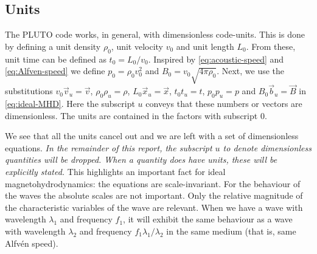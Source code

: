 \subsection{Units}
\label{sec:units}
The PLUTO code works, in general, with dimensionless code-units. This is done by defining a unit density $\rho_0$, unit velocity $v_0$ and unit length $L_0$.
From these, unit time can be defined as $t_0=L_0/v_0$. Inspired by \cref{eq:acoustic-speed} and \cref{eq:Alfven-speed} we define $p_0=\rho_0v_0^2$ and $B_0=v_0\sqrt{4\pi\rho_0}$.
Next, we use the substitutions $v_0\vec{v}_u=\vec{v}$, $\rho_0\rho_u=\rho$, $L_0\vec{x}_u=\vec{x}$, $t_0t_u=t$, $p_0p_u=p$ and $B_0\vec{b}_u=\vec{B}$ in \cref{eq:ideal-MHD}.
Here the subscript $u$ conveys that these numbers or vectors are dimensionless. The units are contained in the factors with subscript $0$.

{\centering 
\noindent {}
\par}

We see that all the units cancel out and we are left with a set of dimensionless equations.
\emph{In the remainder of this report, the subscript $u$ to denote dimensionless quantities will be dropped. When a quantity does have units, these will be explicitly stated.}
This highlights an important fact for ideal magnetohydrodynamics: the equations are scale-invariant.
For the behaviour of the waves the absolute scales are not important. Only the relative magnitude of the characteristic variables of the wave are relevant.
When we have a wave with wavelength $\lambda_1$ and frequency $f_1$, it will exhibit the same behaviour as a wave with wavelength $\lambda_2$ and frequency $f_1 \lambda_1/\lambda_2$ in the same medium (that is, same Alfvén speed).

